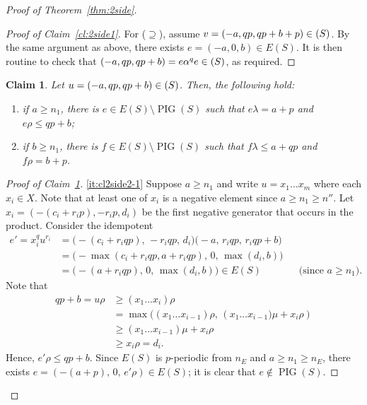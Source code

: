 \documentclass[reqno]{amsart}
\theoremstyle{plain}
\newtheorem{claim}{Claim}[lem]
\theoremstyle{definition}
\DeclareMathOperator{\PIG}{PIG}
\let\P\relax
\DeclareMathOperator{\P}{\textup{\textsf{P}}}
\numberwithin{equation}{section}
\begin{document}
\begin{proof}[Proof of Theorem~\ref{thm:2side}]
\begin{proof}[Proof of Claim~\ref{cl:2side1}]
For ($\supseteq$), assume $v = (-a, qp, qp+b+p)\in \P(S)$. By the same argument as above, there exists $e = (-a, 0, b)\in E(S)$. It is then routine to check that $(-a, qp, qp+b) = e\alpha^qe \in \P(S)$, as required.
\end{proof}

\begin{claim}
\label{cl:2side2}
Let $u = (-a, qp, qp+b)\in \P(S)$. Then, the following hold:
\begin{enumerate}[topsep=0mm, leftmargin=14mm,itemsep=1mm,label=\textup{(\arabic*)}]
    \item \label{it:cl2side2-1}if $a\geq n_1$, there is $e\in E(S)\setminus\PIG(S)$ such that $e\lambda = a+p$ and $e\rho \leq qp+b$;
    \item \label{it:cl2side2-2}
    if $b\geq n_1$, there is $f\in E(S)\setminus\PIG(S)$ such that $f\lambda \leq a+qp$ and $f\rho = b+p$.
\end{enumerate}
\end{claim}

\begin{proof}[Proof of Claim~\ref{cl:2side2}]
\ref{it:cl2side2-1} Suppose $a\geq n_1$ and write $u = x_1\dots x_m$ where each $x_i\in X$. Note that at least one of $x_i$ is a negative element since $a\geq n_1\geq n''$. Let $x_i = (-(c_i+r_ip), -r_ip, d_i)$ be the first negative generator that occurs in the product. Consider the idempotent 
\begin{align*}
    e' = x_i^{q}u^{r_i} &= \bigl(-(c_i+r_iqp),\, -r_iqp,\, d_i\bigr) \big(-a,\, r_iqp,\, r_iqp+b\bigr)\\
    &= \big(-\max(c_i+r_iqp, a+r_iqp),\, 0,\, \max(d_i, b)\bigr)\\
    &= \big(-(a+r_iqp),\, 0,\, \max(d_i,b)\bigr)\in E(S) &&\text{(since $a\geq n_1$)}.
\end{align*}
Note that 
\begin{align*}
    qp+b = u\rho &\geq (x_1\dots x_{i})\rho\\
    &= \max\bigl((x_1\dots x_{i-1})\rho, \, (x_1\dots x_{i-1}\bigr)\mu + x_{i}\rho)\\
    &\geq (x_1\dots x_{i-1})\mu+x_i\rho\\
    &\geq x_i\rho = d_i.
\end{align*}
Hence, $e'\rho\leq qp+b$. Since $E(S)$ is $p$-periodic from $n_E$ and $a\geq n_1\geq n_E$, there exists $e = (-(a+p),\, 0,\, e'\rho)\in E(S)$; it is clear that $e\notin \PIG(S)$.



\end{proof}
\end{proof}
\end{document}
